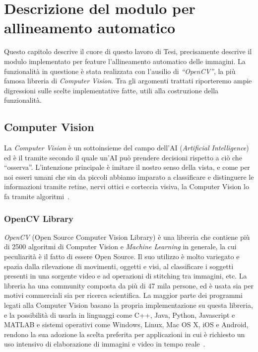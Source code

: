 \chapter{Descrizione del modulo per allineamento automatico}
\label{chap:descriptionnewtool} 
\noindent Questo capitolo descrive il cuore di questo lavoro di Tesi, precisamente descrive il modulo implementato per feature l'allineamento automatico delle immagini. La funzionalità in questione è stata realizzata con l'ausilio di \textit{``OpenCV''}, la più famosa libreria di \textit{Computer Vision}. Tra gli argomenti trattati riporteremo ampie digressioni sulle scelte implementative fatte, utili alla costruzione della funzionalità.

\section{Computer Vision}
\noindent La \textit{Computer Vision} è un sottoinsieme del campo dell'AI (\textit{Artificial Intelligence}) ed è il tramite secondo il quale un'AI può prendere decisioni rispetto a ciò che ``osserva''. L'intenzione principale è imitare il nostro senso della vista, e come per noi esseri umani che sin da piccoli abbiamo imparato a classificare e distinguere le informazioni tramite retine, nervi ottici e corteccia visiva, la Computer Vision lo fa tramite algoritmi~\cite{IBM_CV}.

\subsection{OpenCV Library}
\noindent \textit{OpenCV} (Open Source Computer Vision Library) è una libreria che contiene più di 2500 algoritmi di Computer Vision e \textit{Machine Learning} in generale, la cui peculiarità è il fatto di essere Open Source. Il suo utilizzo è molto variegato e spazia dalla rilevazione di movimenti, oggetti e visi, al classificare i soggetti presenti in una sorgente video e ad operazioni di stitching tra immagini, etc. La libreria ha una community composta da più di 47 mila persone, ed è usata sia per motivi commerciali sia per ricerca scientifica. La maggior parte dei programmi legati alla Computer Vision basano la propria implementazione su questa libreria, e la possibilità di usarla in linguaggi come C++, Java, Python, Javascript e MATLAB e sistemi operativi come Windows, Linux, Mac OS X, iOS e Android, rendono la sua adozione la scelta preferita per applicazioni in cui è richiesto un uso intensivo di elaborazione di immagini e video in tempo reale~\cite{opencv_library}.

